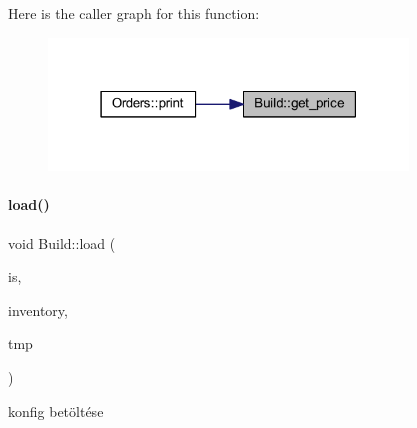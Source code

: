Here is the caller graph for this function\+:
\nopagebreak
\begin{figure}[H]
\begin{center}
\leavevmode
\includegraphics[width=271pt]{class_build_aded745a17c7d6b569244cb377ff62a9c_icgraph}
\end{center}
\end{figure}
\mbox{\label{class_build_a754a988f73da756210b083814986f2f1}} 
\paragraph{\texorpdfstring{load()}{load()}}
{\footnotesize\ttfamily void Build\+::load (\begin{DoxyParamCaption}\item[{std\+::fstream \&}]{is,  }\item[{\mbox{\hyperlink{class_inventory}{Inventory}} \&}]{inventory,  }\item[{\mbox{\hyperlink{struct_temp_input}{Temp\+Input}} \&}]{tmp }\end{DoxyParamCaption})}



konfig betöltése 

